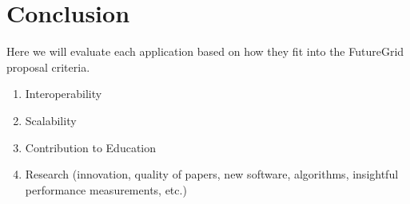 \documentclass[]{paper}
\begin{document}
\section{Conclusion}
Here we will evaluate each application based on how they fit into the FutureGrid proposal
criteria.
\begin{enumerate}
\item Interoperability
\item Scalability
\item Contribution to Education
\item Research (innovation, quality of papers, new software, algorithms, insightful performance measurements, etc.)

\end{enumerate}
\begin{thebibliography}{9}
\end{thebibliography}
\end{document}
